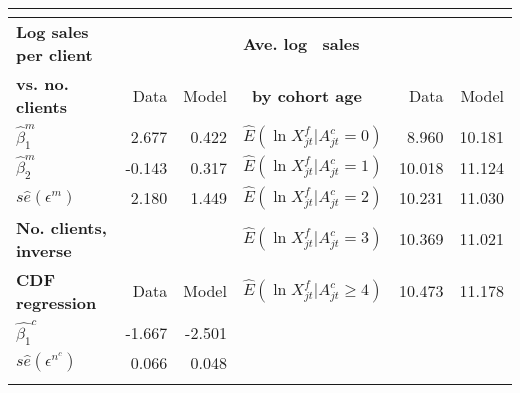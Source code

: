 \documentclass[notes=show]{beamer}
\begin{document}
\begin{frame}%


\begin{center}
{\small 
\begin{tabular}{llllll}
\multicolumn{6}{c}{} \\ \hline\hline
\textbf{Log sales per client }    &                            &                             & \textbf{Ave. log \ sales}                      &                             &                            \\
\textbf{vs. no. clients}          & \multicolumn{1}{r}{Data}   & \multicolumn{1}{r}{ Model}  & \textbf{\ by cohort age }                      & \multicolumn{1}{r}{Data}    & \multicolumn{1}{r}{Model}  \\ \hline
$\widehat{\beta }_{1}^{m}$        & \multicolumn{1}{r}{2.677}  & \multicolumn{1}{r}{0.422}   & $\widehat{E}(\ln X_{jt}^{f}|A_{jt}^{c}=0)$     & \multicolumn{1}{r}{ 8.960}  & \multicolumn{1}{r}{10.181} \\
$\widehat{\beta }_{2}^{m}$        & \multicolumn{1}{r}{-0.143} & \multicolumn{1}{r}{0.317}   & $\widehat{E}(\ln X_{jt}^{f}|A_{jt}^{c}=1)$     & \multicolumn{1}{r}{ 10.018} & \multicolumn{1}{r}{11.124} \\
$s\widehat{e}(\epsilon ^{m})$     & \multicolumn{1}{r}{2.180}  & \multicolumn{1}{r}{1.449}   & $\widehat{E}(\ln X_{jt}^{f}|A_{jt}^{c}=2)$     & \multicolumn{1}{r}{10.231}  & \multicolumn{1}{r}{11.030} \\
\textbf{No. clients, inverse}     & \multicolumn{1}{r}{}       & \multicolumn{1}{r}{}        & $\widehat{E}(\ln X_{jt}^{f}|A_{jt}^{c}=3)$     & \multicolumn{1}{r}{10.369}  & \multicolumn{1}{r}{11.021} \\
\textbf{CDF regression}           & \multicolumn{1}{r}{Data}   & \multicolumn{1}{r}{Model }  & $\widehat{E}(\ln X_{jt}^{f}|A_{jt}^{c}\geq 4)$ & \multicolumn{1}{r}{ 10.473} & \multicolumn{1}{r}{11.178} \\ \cline{1-3}
$\widehat{\beta _{1}}^{c}$        & \multicolumn{1}{r}{-1.667} & \multicolumn{1}{r}{ -2.501} &                                                & \multicolumn{1}{r}{}        & \multicolumn{1}{r}{}       \\
$s\widehat{e}(\epsilon ^{n^{c}})$ & \multicolumn{1}{r}{0.066}  & \multicolumn{1}{r}{  0.048} &                                                & \multicolumn{1}{r}{}        & \multicolumn{1}{r}{}       \\
                                  &                            &                             &                                                & \multicolumn{1}{r}{}        & \multicolumn{1}{r}{}       \\ \hline
\end{tabular}%
}{\tiny \ }
\end{center}

\end{frame}%
\end{document}
